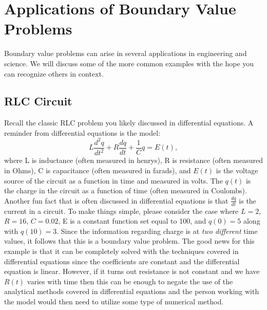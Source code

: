 \documentclass[twoside]{article}
\def\ds{\displaystyle}
\begin{document}
\section{Applications of Boundary Value Problems}

Boundary value problems can arise in several applications in engineering and science. We will discuss some of the more common examples with the hope you can recognize others in context. 

\subsection{RLC Circuit }

Recall the classic RLC problem you likely discussed in differential equations. A reminder from differential equations is the model:
\begin{equation}
L \frac{d^2q}{dt^2} + R\frac {dq}{dt} + \frac 1C q = E(t),
\label{e:RLCbvp}
\end{equation}
where L is inductance (often measured in henrys), R is resistance (often measured in Ohms), C is capacitance (often measured in farads), and $E(t)$ is the voltage source of the circuit as a function in time and measured in volts. The $q(t)$ is the charge in the circuit as a function of time (often measured in Coulombs). Another fun fact that is often discussed in differential equations is that $\ds \frac {dq}{dt}$ is the current in a circuit. To make things simple, please consider the case where $L=2$, $R=16$, $C=0.02$, E is a constant function set equal to 100, and $q(0)=5$ along with $q(10)=3$. Since the information regarding charge is at {\it two different} time values, it follows that this is a boundary value problem. The good news for this example is that it can be completely solved with the techniques covered in differential equations since the coefficients are constant and the differential equation is linear. However, if it turns out resistance is not constant and we have $R(t)$ varies with time then this can be enough to negate the use of the analytical methods covered in differential equations and the person working with the model would then need to utilize some type of numerical method. 
\end{document}
